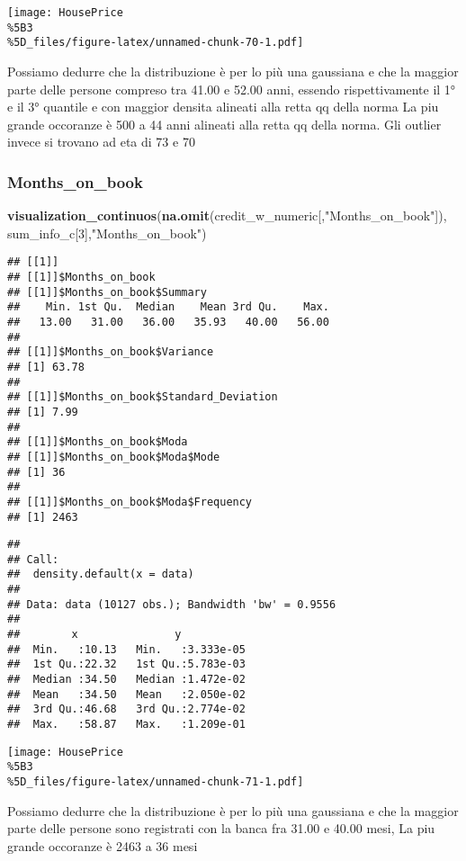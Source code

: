 \documentclass[
]{article}
\newenvironment{Shaded}{\begin{snugshade}}{\end{snugshade}}
\newcommand{\DecValTok}[1]{\textcolor[rgb]{0.00,0.00,0.81}{#1}}
\newcommand{\FunctionTok}[1]{\textcolor[rgb]{0.13,0.29,0.53}{\textbf{#1}}}
\newcommand{\NormalTok}[1]{#1}
\newcommand{\StringTok}[1]{\textcolor[rgb]{0.31,0.60,0.02}{#1}}
\begin{document}
\texttt{[image: HousePrice\\\%5B3\\\%5D\_files/figure-latex/unnamed-chunk-70-1.pdf]}

Possiamo dedurre che la distribuzione è per lo più una gaussiana e che
la maggior parte delle persone compreso tra 41.00 e 52.00 anni, essendo
rispettivamente il 1° e il 3° quantile e con maggior densita alineati
alla retta qq della norma La piu grande occoranze è 500 a 44 anni
alineati alla retta qq della norma. Gli outlier invece si trovano ad eta
di 73 e 70

\subsubsection{Months\_on\_book}\label{months_on_book}

\begin{Shaded}
\begin{Highlighting}[]
\FunctionTok{visualization\_continuos}\NormalTok{(}\FunctionTok{na.omit}\NormalTok{(credit\_w\_numeric[,}\StringTok{"Months\_on\_book"}\NormalTok{]), sum\_info\_c[}\DecValTok{3}\NormalTok{],}\StringTok{"Months\_on\_book"}\NormalTok{)}
\end{Highlighting}
\end{Shaded}

\begin{verbatim}
## [[1]]
## [[1]]$Months_on_book
## [[1]]$Months_on_book$Summary
##    Min. 1st Qu.  Median    Mean 3rd Qu.    Max. 
##   13.00   31.00   36.00   35.93   40.00   56.00 
## 
## [[1]]$Months_on_book$Variance
## [1] 63.78
## 
## [[1]]$Months_on_book$Standard_Deviation
## [1] 7.99
## 
## [[1]]$Months_on_book$Moda
## [[1]]$Months_on_book$Moda$Mode
## [1] 36
## 
## [[1]]$Months_on_book$Moda$Frequency
## [1] 2463
\end{verbatim}

\begin{verbatim}
## 
## Call:
##  density.default(x = data)
## 
## Data: data (10127 obs.); Bandwidth 'bw' = 0.9556
## 
##        x               y            
##  Min.   :10.13   Min.   :3.333e-05  
##  1st Qu.:22.32   1st Qu.:5.783e-03  
##  Median :34.50   Median :1.472e-02  
##  Mean   :34.50   Mean   :2.050e-02  
##  3rd Qu.:46.68   3rd Qu.:2.774e-02  
##  Max.   :58.87   Max.   :1.209e-01
\end{verbatim}

\texttt{[image: HousePrice\\\%5B3\\\%5D\_files/figure-latex/unnamed-chunk-71-1.pdf]}

Possiamo dedurre che la distribuzione è per lo più una gaussiana e che
la maggior parte delle persone sono registrati con la banca fra 31.00 e
40.00 mesi, La piu grande occoranze è 2463 a 36 mesi
\end{document}
